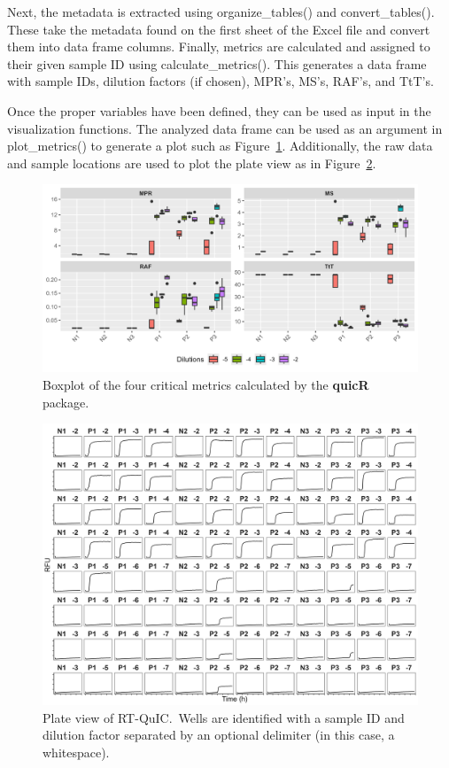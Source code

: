 \documentclass[preprint,12pt,a4paper]{elsarticle}
\begin{document}
            Next, the metadata is extracted using organize\_tables() and convert\_tables(). These take the metadata found on the first sheet of the Excel file and convert them into data frame columns. Finally, metrics are calculated and assigned to their given sample ID using calculate\_metrics(). This generates a data frame with sample IDs, dilution factors (if chosen), MPR's, MS's, RAF's, and TtT's.

            Once the proper variables have been defined, they can be used as input in the visualization functions. The analyzed data frame can be used as an argument in plot\_metrics() to generate a plot such as Figure~\ref{fig:boxplot}. Additionally, the raw data and sample locations are used to plot the plate view as in Figure~\ref{fig:plateview}.

            \begin{figure}[ht]
                \centering
                \includegraphics[width=\textwidth]{images/boxplot.png}
                \caption{Boxplot of the four critical metrics calculated by the \textbf{quicR} package.}\label{fig:boxplot}
            \end{figure}

            \begin{figure}[ht]
                \centering
                \includegraphics[width=\textwidth]{images/plate_view.png}
                \caption{Plate view of RT-QuIC.\ Wells are identified with a sample ID and dilution factor separated by an optional delimiter (in this case, a whitespace).}\label{fig:plateview}
            \end{figure}
            
\end{document}
